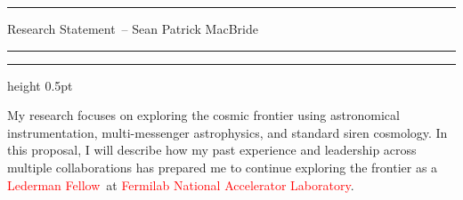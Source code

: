 \documentclass[11pt]{article}
\newcommand{\tcolor}{red}
\newcommand{\yourname}{Sean Patrick MacBride}
\newcommand{\soptitle}{Research Statement}
\newcommand{\Institute}{\textcolor{\tcolor}{Fermilab National Accelerator Laboratory}}
\newcommand{\Position}{\textcolor{\tcolor}{Lederman Fellow}}
\begin{document}
\hrule
\begin{center}
    \Large\soptitle\ -- \yourname
\end{center}
\vspace{0pt}
\hrule
\vspace{0.5pt}
\hrule height 0.5pt
\vspace{3pt}

\normalsize
\noindent My research focuses on exploring the cosmic frontier using astronomical instrumentation, multi-messenger astrophysics, and standard siren cosmology.
In this proposal, I will describe how my past experience and leadership across multiple collaborations has prepared me to continue exploring the frontier as a \Position\ at \Institute.

  
\end{document}
